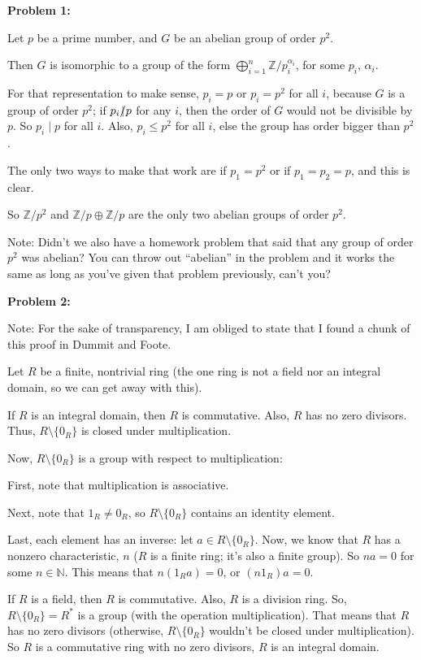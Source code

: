 \documentclass[a4paper,12pt]{article}
\newcommand{\tab}{\hspace{4mm}} %
\newcommand{\shunt}{\vspace{20mm}}
\newcommand{\al}{\alpha} %
\newcommand{\N}{\mathbb{N}}
\newcommand{\Z}{\mathbb{Z}}
\begin{document}
{\bf Problem 1:}

Let $p$ be a prime number, and $G$ be an abelian group of order $p^2$.

Then $G$ is isomorphic to a group of the form $\bigoplus\limits_{i=1}^n \Z/p_i^{\al_i}$, for some $p_i$, $\al_i$.

For that representation to make sense, $p_i=p$ or $p_i=p^2$ for all $i$, because $G$ is a group of order $p^2$; if $p_i \slashed{\mid} p$ for any $i$, then the order of $G$ would not be divisible by $p$. So $p_i \mid p$ for all $i$. Also, $p_i \leq p^2$ for all $i$, else the group has order bigger than $p^2$.

The only two ways to make that work are if $p_1 = p^2$ or if $p_1=p_2=p$, and this is clear.

So $\Z/p^2$ and $\Z/p \oplus \Z/p$ are the only two abelian groups of order $p^2$.

Note: Didn't we also have a homework problem that said that any group of order $p^2$ was abelian? You can throw out ``abelian'' in the problem and it works the same as long as you've given that problem previously, can't you?

\shunt

{\bf Problem 2:} %

Note: For the sake of transparency, I am obliged to state that I found a chunk of this proof in Dummit and Foote.

Let $R$ be a finite, nontrivial ring (the one ring is not a field nor an integral domain, so we can get away with this). 

If $R$ is an integral domain, then $R$ is commutative. Also, $R$ has no zero divisors. Thus, $R \setminus \{0_R\}$ is closed under multiplication.

Now, $R \setminus \{0_R\}$ is a group with respect to multiplication:

\tab First, note that multiplication is associative.

\tab Next, note that $1_R \neq 0_R$, so $R \setminus \{0_R\}$ contains an identity element.

\tab Last, each element has an inverse: let $a \in R \setminus \{0_R\}$. Now, we know that $R$ has a nonzero characteristic, $n$ ($R$ is a finite ring; it's also a finite group). So $na = 0$ for some $n \in \N$. This means that $n(1_Ra) = 0$, or $(n1_R)a=0$. 

If $R$ is a field, then $R$ is commutative. Also, $R$ is a division ring. So, $R \setminus \{0_R\} = R^*$ is a group (with the operation multiplication). That means that $R$ has no zero divisors (otherwise, $R \setminus \{0_R\}$ wouldn't be closed under multiplication). So $R$ is a commutative ring with no zero divisors, $R$ is an integral domain.
\end{document}
